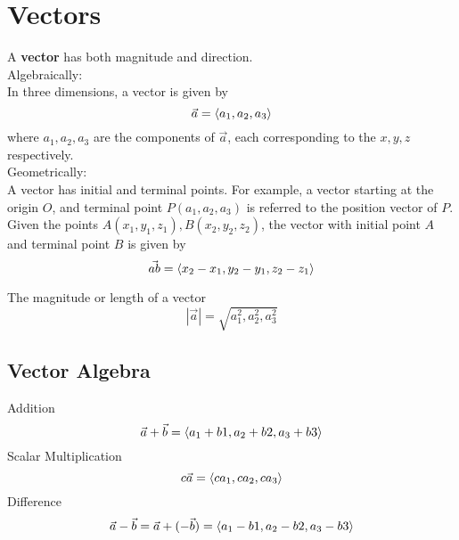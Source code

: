 \documentclass[twoside]{report}
\begin{document}
    \section{Vectors}
    \begin{definition}[Vectors]
        A \textbf{vector} has both magnitude and direction.\\
        Algebraically:\\
        In three dimensions, a vector is given by
        \begin{equation}
            \vec{a} = \langle a_{1}, a_{2}, a_{3}\rangle
        \end{equation}
        where $a_{1}, a_{2}, a_{3}$ are the components of $\vec{a}$, each corresponding to the $x, y, z$ respectively.\\
        Geometrically:\\
        A vector has initial and terminal points. For example, a vector starting at the origin $O$, and terminal point $P(a_{1}, a_{2}, a_{3})$ is referred to the position vector of $P$.\\
        Given the points $A(x_{1}, y_{1}, z_{1}), B(x_{2}, y_{2}, z_{2})$, the vector with initial point $A$ and terminal point $B$ is given by
        \begin{equation}
            \vec{ab} = \langle x_{2} - x_{1}, y_{2} - y_{1}, z_{2} - z_{1}\rangle
        \end{equation}
    \end{definition}
    \begin{definition}[Magnitude]
        The magnitude or length of a vector
        \begin{equation}
            |\vec{a}| = \sqrt{a_{1}^{2}, a_{2}^{2}, a_{3}^{2}}
        \end{equation}
    \end{definition}
    \subsection{Vector Algebra}
    Addition
    \begin{equation}
        \vec{a} + \vec{b} = \langle a_{1} + b{1}, a_{2} + b{2}, a_{3} + b{3}\rangle
    \end{equation}
    Scalar Multiplication
    \begin{equation}
        c\vec{a} = \langle ca_{1}, ca_{2}, ca_{3}\rangle
    \end{equation}
    Difference
    \begin{equation}
        \vec{a} - \vec{b} = \vec{a} + (-\vec{b})  = \langle a_{1} - b{1}, a_{2} - b{2}, a_{3} - b{3}\rangle
    \end{equation}
    \begin{definition}
    \end{definition}
\end{document}
